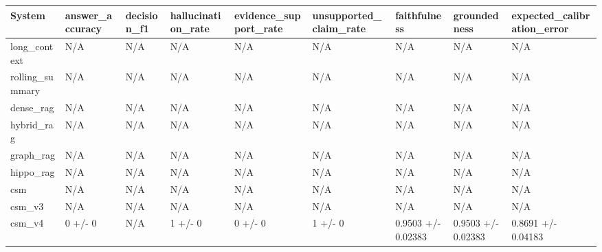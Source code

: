 \begin{tabular}{lllllllll}
System & answer_accuracy & decision_f1 & hallucination_rate & evidence_support_rate & unsupported_claim_rate & faithfulness & groundedness & expected_calibration_error \\
\hline
long\_context & N/A & N/A & N/A & N/A & N/A & N/A & N/A & N/A \\
rolling\_summary & N/A & N/A & N/A & N/A & N/A & N/A & N/A & N/A \\
dense\_rag & N/A & N/A & N/A & N/A & N/A & N/A & N/A & N/A \\
hybrid\_rag & N/A & N/A & N/A & N/A & N/A & N/A & N/A & N/A \\
graph\_rag & N/A & N/A & N/A & N/A & N/A & N/A & N/A & N/A \\
hippo\_rag & N/A & N/A & N/A & N/A & N/A & N/A & N/A & N/A \\
csm & N/A & N/A & N/A & N/A & N/A & N/A & N/A & N/A \\
csm\_v3 & N/A & N/A & N/A & N/A & N/A & N/A & N/A & N/A \\
csm\_v4 & 0 +/- 0 & N/A & 1 +/- 0 & 0 +/- 0 & 1 +/- 0 & 0.9503 +/- 0.02383 & 0.9503 +/- 0.02383 & 0.8691 +/- 0.04183 \\
\end{tabular}

